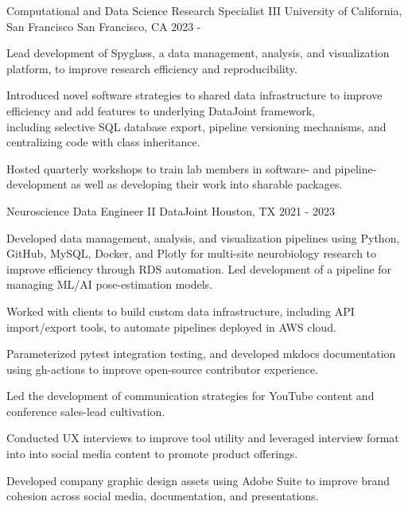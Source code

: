 \begin{cventries}
  \cventry
    {Computational and Data Science Research Specialist III}
    {University of California, San Francisco}
    {San Francisco, CA}
    {2023 - }
    {
      \begin{cvitems}
        \item {Lead development of Spyglass, a data management, analysis, and 
          visualization platform, to improve research efficiency and reproducibility.}
        \item {Introduced novel software strategies to shared data infrastructure 
          to improve efficiency and add features to underlying DataJoint framework, \\
          including selective SQL database export, pipeline versioning mechanisms, and centralizing code with class inheritance.}
        \item {Hosted quarterly workshops to train lab members in software- and 
          pipeline-development as well as developing their work into sharable
          packages.}
      \end{cvitems}
    }
  \cventry
    {Neuroscience Data Engineer II}
    {DataJoint}
    {Houston, TX}
    {2021 - 2023}
    {
      \begin{cvitems}
        \item {Developed data management, analysis, and visualization pipelines 
          using Python, GitHub, MySQL, Docker, and Plotly for multi-site 
          neurobiology research to improve efficiency through RDS automation. 
          Led development of a pipeline for managing ML/AI pose-estimation models.}
        \item {Worked with clients to build custom data infrastructure, including
          API import/export tools, to automate pipelines deployed in AWS cloud.}
        \item {Parameterized pytest integration testing, and developed mkdocs 
          documentation using gh-actions to improve open-source contributor experience.}
        \item {Led the development of communication strategies for YouTube 
          content and conference sales-lead cultivation.}
        \item {Conducted UX interviews to improve tool utility and leveraged interview format into into social media content to promote product offerings.}
        \item {Developed company graphic design assets using Adobe Suite to improve brand cohesion across social media, documentation, and presentations.}

\end{cvitems}}
\end{cventries}

